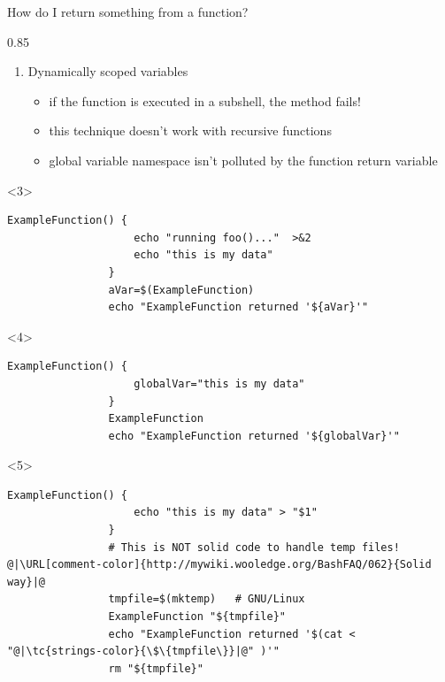 \begin{frame}[fragile]{How do I return something from a function?}
\begin{overlayarea}{\textwidth}{0.85\textheight}
\begin{enumerate}
\begin{itemize}[<only@{5,7}>]
                           \end{itemize}
            \item<only@6-> Dynamically scoped variables
                           \begin{itemize}
                               \item[\crossmark] if the function is executed in a subshell, the method fails!
                               \item[\crossmark] this technique doesn't work with recursive functions
                               \item[\checkmark] global variable namespace isn't polluted by the function return variable
                           \end{itemize}
        \end{enumerate}
        \begin{onlyenv}<3>
            \begin{lstlisting}[style=MyBash, numbers=none]
                ExampleFunction() {
                    echo "running foo()..."  >&2
                    echo "this is my data"
                }
                aVar=$(ExampleFunction)
                echo "ExampleFunction returned '${aVar}'"
            \end{lstlisting}
        \end{onlyenv}
        \begin{onlyenv}<4>
            \begin{lstlisting}[style=MyBash, numbers=none]
                ExampleFunction() {
                    globalVar="this is my data"
                }
                ExampleFunction
                echo "ExampleFunction returned '${globalVar}'"
            \end{lstlisting}
        \end{onlyenv}
        \begin{onlyenv}<5>
            \begin{lstlisting}[style=MyBash, numbers=none]
                ExampleFunction() {
                    echo "this is my data" > "$1"
                }
                # This is NOT solid code to handle temp files! @|\URL[comment-color]{http://mywiki.wooledge.org/BashFAQ/062}{Solid way}|@
                tmpfile=$(mktemp)   # GNU/Linux
                ExampleFunction "${tmpfile}"
                echo "ExampleFunction returned '$(cat < "@|\tc{strings-color}{\$\{tmpfile\}}|@" )'"
                rm "${tmpfile}"
            \end{lstlisting}

\end{onlyenv}
\end{overlayarea}
\end{frame}
